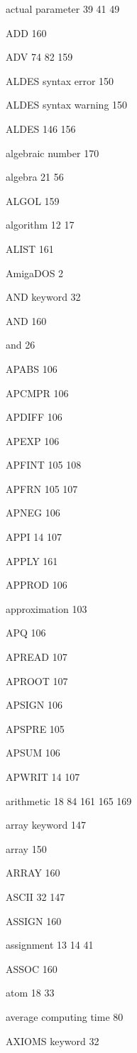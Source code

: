 \item actual parameter  39 41 49
\item ADD 160
\item ADV  74 82 159
\item ALDES syntax error 150
\item ALDES syntax warning 150
\item ALDES  146 156
\item algebraic number 170
\item algebra  21 56
\item ALGOL 159
\item algorithm  12 17
\item ALIST 161
\item AmigaDOS 2
\item AND keyword 32
\item AND 160
\item and 26
\item APABS 106
\item APCMPR 106
\item APDIFF 106
\item APEXP 106
\item APFINT  105 108
\item APFRN  105 107
\item APNEG 106
\item APPI  14 107
\item APPLY 161
\item APPROD 106
\item approximation 103
\item APQ 106
\item APREAD 107
\item APROOT 107
\item APSIGN 106
\item APSPRE 105
\item APSUM 106
\item APWRIT  14 107
\item arithmetic  18 84  161 165 169
\item array keyword 147
\item array 150
\item ARRAY 160
\item ASCII  32 147
\item ASSIGN 160
\item assignment  13 14 41
\item ASSOC 160
\item atom  18 33
\item average computing time 80
\item AXIOMS keyword 32

